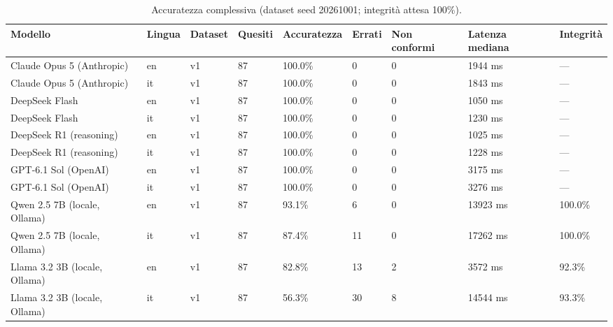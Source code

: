 \begin{table}[htbp]
\centering\small
\begin{tabularx}{\textwidth}{lXXXXXXXX}
\toprule
Modello & Lingua & Dataset & Quesiti & Accuratezza & Errati & Non conformi & Latenza mediana & Integrità \\
\midrule
Claude Opus 5 (Anthropic) & en & v1 & 87 & 100.0\% & 0 & 0 & 1944 ms & — \\
Claude Opus 5 (Anthropic) & it & v1 & 87 & 100.0\% & 0 & 0 & 1843 ms & — \\
DeepSeek Flash & en & v1 & 87 & 100.0\% & 0 & 0 & 1050 ms & — \\
DeepSeek Flash & it & v1 & 87 & 100.0\% & 0 & 0 & 1230 ms & — \\
DeepSeek R1 (reasoning) & en & v1 & 87 & 100.0\% & 0 & 0 & 1025 ms & — \\
DeepSeek R1 (reasoning) & it & v1 & 87 & 100.0\% & 0 & 0 & 1228 ms & — \\
GPT-6.1 Sol (OpenAI) & en & v1 & 87 & 100.0\% & 0 & 0 & 3175 ms & — \\
GPT-6.1 Sol (OpenAI) & it & v1 & 87 & 100.0\% & 0 & 0 & 3276 ms & — \\
Qwen 2.5 7B (locale, Ollama) & en & v1 & 87 & 93.1\% & 6 & 0 & 13923 ms & 100.0\% \\
Qwen 2.5 7B (locale, Ollama) & it & v1 & 87 & 87.4\% & 11 & 0 & 17262 ms & 100.0\% \\
Llama 3.2 3B (locale, Ollama) & en & v1 & 87 & 82.8\% & 13 & 2 & 3572 ms & 92.3\% \\
Llama 3.2 3B (locale, Ollama) & it & v1 & 87 & 56.3\% & 30 & 8 & 14544 ms & 93.3\% \\
\bottomrule
\end{tabularx}
\caption{Accuratezza complessiva (dataset seed 20261001; integrità attesa 100\%).}
\label{tab:risultati}
\end{table}
